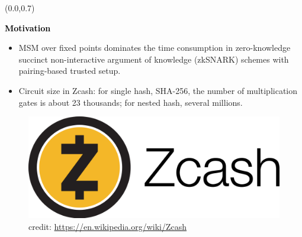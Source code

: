 \documentclass{beamer}                  %
\newcommand{\UW}[1]{\textbf{\textcolor{black}{#1}}}
\newcommand{\UWtitle}[1]{
	\begin{textblock}{12.8}(0.0,0.7)
		\begin{center} 
			\textbf{\UW{\Large{#1}}}
		\end{center}
	\end{textblock}
}
\begin{document}
\begin{frame}


\UWtitle{Motivation}

\begin{itemize}
	\item MSM over fixed points dominates the time consumption in zero-knowledge succinct non-interactive argument of knowledge (zkSNARK) schemes with  pairing-based trusted setup.		
			
			\item 	 Circuit size in Zcash: for single hash, SHA-256, the number of multiplication gates is about 23 thousands; for nested hash, several millions.

\end{itemize}

\vspace{0.25in}

\begin{center}
		\begin{figure}
			\centering
			\includegraphics[width=0.4\linewidth]{Figures/Zcash_logo}
			\captionsetup{labelformat=empty}
			\caption{\centering \footnotesize credit: \url{https://en.wikipedia.org/wiki/Zcash}}
		\end{figure}
\end{center}
							
\end{frame}

\end{document}
